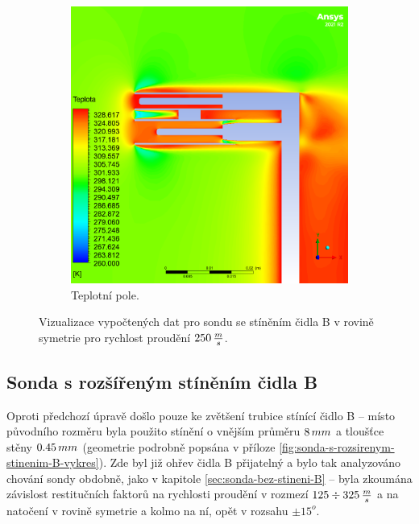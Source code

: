 \begin{figure}[ht!]
\begin{subfigure}{0.45\textwidth}
                \includegraphics[width=\textwidth]{400_SIMULACE_KONSTRUKCNICH_UPRAV/Vizualizace/sonda_se_stinenim_B_vizualizace_teplota.png}
                \caption{Teplotní pole.}
            \end{subfigure}
            \caption{Vizualizace vypočtených dat pro sondu se stíněním čidla B v rovině symetrie pro rychlost proudění $250 \, \frac{m}{s}$.}
            \label{fig:sonda-se-stinenim-B-vizualizace}
        \end{figure}
    
    \newpage
    \subsection{Sonda s rozšířeným stíněním čidla B}
        Oproti předchozí úpravě došlo pouze ke zvětšení trubice stínící čidlo B – místo původního rozměru byla použito stínění o vnějším průměru $8 \, mm$ a tloušťce stěny $0.45 \, mm$ (geometrie podrobně popsána v příloze \ref{fig:sonda-s-rozsirenym-stinenim-B-vykres}). Zde byl již ohřev čidla B přijatelný a bylo tak analyzováno chování sondy obdobně, jako v kapitole \ref{sec:sonda-bez-stineni-B} – byla zkoumána závislost restitučních faktorů na rychlosti proudění v rozmezí $125 \div 325 \, \frac{m}{s}$ a na natočení v rovině symetrie a kolmo na ní, opět v rozsahu $\pm 15^o$.
        
